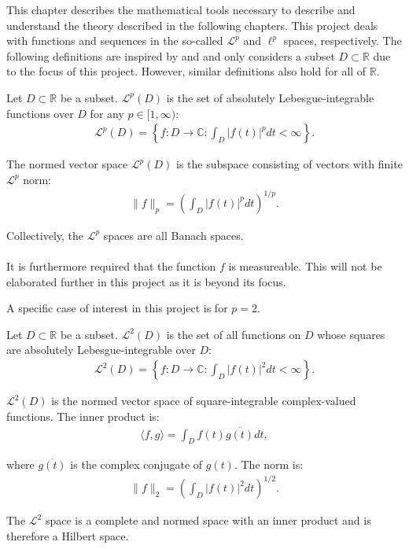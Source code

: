 This chapter describes the mathematical tools necessary to describe and understand the theory described in the following chapters. This project deals with functions and sequences in the so-called $\mathcal{L}^p$ and $\ell^p$ spaces, respectively. The following definitions are inspired by \cite{chapter 5-6, FSE2010} and \cite{chapter 2, FSP} and only considers a subset $D \subset \mathbb{R}$ due to the focus of this project. However, similar definitions also hold for all of $\mathbb{R}$.

\begin{definition} \label{def:Lpspace}
Let $D \subset \mathbb{R}$ be a subset. $\mathcal{L}^p(D)$ is the set of absolutely Lebesgue-integrable functions over $D$ for any $p \in [1,\infty)$:
\begin{align*}
\mathcal{L}^p(D) = \left\{ f: D \to \mathbb{C}: \int_D |f(t)|^p dt < \infty \right\}.
\end{align*}

The normed vector space $\mathcal{L}^p(D)$ is the subspace consisting of vectors with finite $\mathcal{L}^p$ norm:
\begin{align*}
\|f\|_p = \left( \int_D |f(t)|^p dt \right)^{1/p}.
\end{align*}

Collectively, the $\mathcal{L}^p$ spaces are all Banach spaces.
\\ \\
It is furthermore required that the function $f$ is measureable. This will not be elaborated further in this project as it is beyond its focus.
\end{definition}

A specific case of interest in this project is for $p = 2$.

\begin{definition} \label{def:L2space}
Let $D \subset \mathbb{R}$ be a subset. $\mathcal{L}^2(D)$ is the set of all functions on $D$ whose squares are absolutely Lebesgue-integrable over $D$:
\begin{align*}
\mathcal{L}^2(D) = \left\{ f: D \to \mathbb{C}: \int_D |f(t)|^2 dt < \infty \right\}.
\end{align*}

$\mathcal{L}^2(D)$ is the normed vector space of square-integrable complex-valued functions. The inner product is:
\begin{align*}
\langle f,g \rangle =  \int_D f(t) \overline{g(t)} dt,
\end{align*}

where $\overline{g(t)}$ is the complex conjugate of $g(t)$. The norm is:
\begin{align*}
\|f\|_2 = \left( \int_D |f(t)|^2 dt \right)^{1/2}.
\end{align*}

The $\mathcal{L}^2$ space is a complete and normed space with an inner product and is therefore a Hilbert space.

\end{definition}

